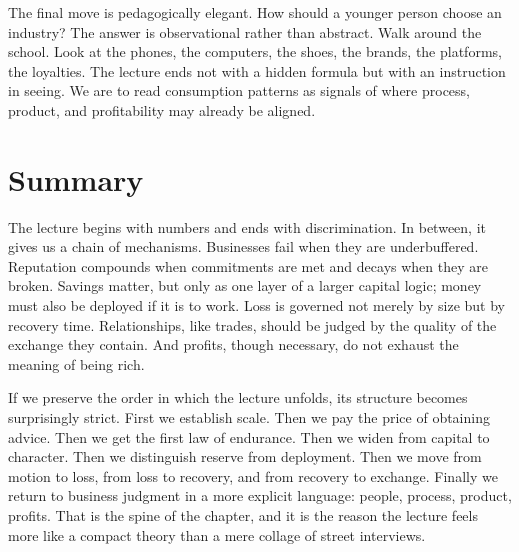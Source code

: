 The final move is pedagogically elegant. How should a younger person choose an industry? The answer is observational rather than abstract. Walk around the school. Look at the phones, the computers, the shoes, the brands, the platforms, the loyalties. The lecture ends not with a hidden formula but with an instruction in seeing. We are to read consumption patterns as signals of where process, product, and profitability may already be aligned.

\section{Summary}

The lecture begins with numbers and ends with discrimination. In between, it gives us a chain of mechanisms. Businesses fail when they are underbuffered. Reputation compounds when commitments are met and decays when they are broken. Savings matter, but only as one layer of a larger capital logic; money must also be deployed if it is to work. Loss is governed not merely by size but by recovery time. Relationships, like trades, should be judged by the quality of the exchange they contain. And profits, though necessary, do not exhaust the meaning of being rich.

If we preserve the order in which the lecture unfolds, its structure becomes surprisingly strict. First we establish scale. Then we pay the price of obtaining advice. Then we get the first law of endurance. Then we widen from capital to character. Then we distinguish reserve from deployment. Then we move from motion to loss, from loss to recovery, and from recovery to exchange. Finally we return to business judgment in a more explicit language: people, process, product, profits. That is the spine of the chapter, and it is the reason the lecture feels more like a compact theory than a mere collage of street interviews.